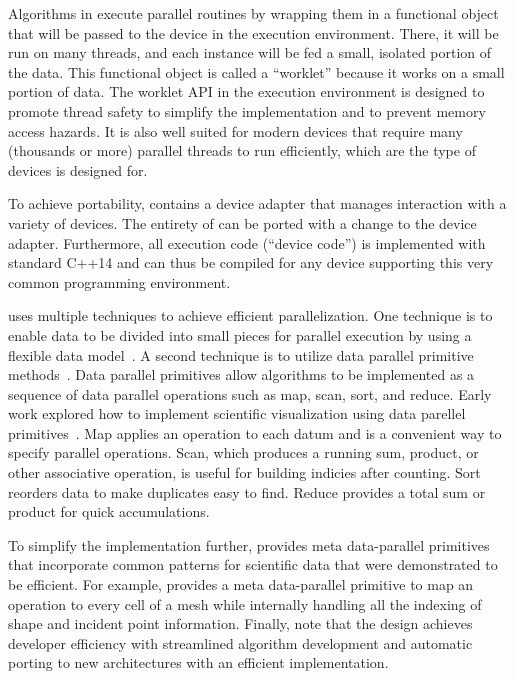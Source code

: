 Algorithms in \vtkm execute parallel routines by wrapping them in a functional object that will be passed to the device in the execution environment. There, it will be run on many threads, and each instance will be fed a small, isolated portion of the data.
This functional object is called a ``worklet'' because it works on a small portion of data.
The worklet API in the execution environment is designed to promote thread safety to simplify the implementation and to prevent memory access hazards.
It is also well suited for modern devices that require many (thousands or more) parallel threads to run efficiently, which are the type of devices \vtkm is designed for.

To achieve portability, \vtkm contains a device adapter that manages interaction with a variety of devices.
The entirety of \vtkm can be ported with a change to the device adapter.
%
Furthermore, all execution code (``device code'') is implemented with standard C++14
and can thus be compiled for any device supporting this very common programming environment.

\vtkm uses multiple techniques to achieve efficient parallelization.
One technique is
to enable data to be divided into small pieces for parallel execution by
using a 
flexible data model~\citep{Meredith2012}.
A second technique is
to utilize
data parallel primitive methods~\citep{Blelloch1990}.
Data parallel primitives allow algorithms to be implemented as a sequence of data parallel operations such as map, scan, sort, and reduce.
Early work explored how to implement scientific visualization using data parellel primitives~\citep{Lo2012}.
Map applies an operation to each datum and is a convenient way to specify parallel operations.
Scan, which produces a running sum, product, or other associative operation, is useful for building indicies after counting.
Sort reorders data to make duplicates easy to find.
Reduce provides a total sum or product for quick accumulations.

To simplify the implementation further, \vtkm provides meta data-parallel primitives~\citep{Moreland2021} that incorporate common patterns for scientific data that were demonstrated to be efficient.
For example, \vtkm provides a meta data-parallel primitive to map an operation to every cell of a mesh while internally handling all the indexing of shape and incident point information.
Finally, note that the \vtkm design achieves developer efficiency with 
streamlined algorithm development and 
automatic
porting to new architectures with an efficient implementation.

